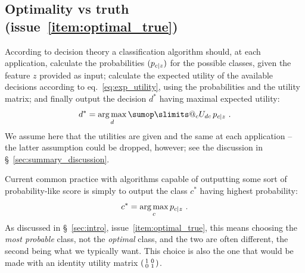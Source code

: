 \documentclass[\ifafour a4paper,12pt,\else a5paper,10pt,\fi%
onecolumn,oneside,article,%
british%
]{memoir}
\makeatletter
\theoremstyle{remark}
\theoremstyle{innote}
\def\sum{\DOTSI\sumop\slimits@}
\newcommand*{\puzzle}{{\fontencoding{U}\fontfamily{fontawesometwo}\selectfont\symbol{225}}}
\newcommand{\mynotez}[1]{{\footnotesize\color{notecolour}\puzzle\ #1}}
\renewcommand*{\|}[1][]{\nonscript\:#1\vert\nonscript\:\mathopen{}}
\newcommand*{\sect}{\S}%
\newcommand*{\eqn}{eq.}%
\DeclareMathOperator*{\argmax}{arg\,max}
\newcommand*{\Po}{\mathord{+}}
\newcommand*{\Ne}{\mathord{-}}
\newcommand*{\tp}{\textrm{tp}}
\newcommand*{\fp}{\textrm{fp}}
\newcommand*{\itemno}{{\fontencoding{U}\fontfamily{pzd}\selectfont\symbol{55}}}
\makeatother
\begin{document}







\subsection{Optimality vs truth (issue~\ref{item:optimal_true})}
\label{sec:optimality_truth}

According to decision theory a classification algorithm should, at each application, calculate the probabilities $(p_{c\|z})$ for the possible classes, given the feature $z$ provided as input; calculate the expected utility of the available decisions according to \eqn~\eqref{eq:exp_utility}, using the probabilities and the utility matrix; and finally output the decision $d^{*}$ having maximal expected utility:
\begin{equation}
  \label{eq:argmax_decision}
  d^{*} = \argmax_{d}   \sum_{c} U_{dc}\, p_{c\|z} \ .
\end{equation}
We assume here that the utilities are given and the same at each application -- the latter assumption could be dropped, however; see the discussion in \sect~\ref{sec:summary_discussion}.

Current common practice with algorithms capable of outputting some sort of probability-like score is simply to output the class $c^{*}$ having highest probability:
\begin{equation}
  \label{eq:argmax_probable}
  c^{*} = \argmax_{c} p_{c\|z} \ .
\end{equation}
As discussed in \sect~\ref{sec:intro}, issue~\ref{item:optimal_true}, this means choosing the \emph{most probable} class, not the \emph{optimal} class, and the two are often different, the second being what we typically want. This choice is also the one that would be made with an identity utility matrix $\begin{psmallmatrix} 1&0\\0&1 \end{psmallmatrix}$.
\end{document}
